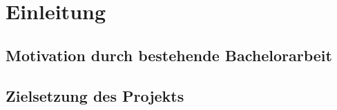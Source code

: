 
\chapter{Einleitung}
\label{ch: Einleitung}
	
	\section{Motivation durch bestehende Bachelorarbeit}
	
	\section{Zielsetzung des Projekts}
	
	